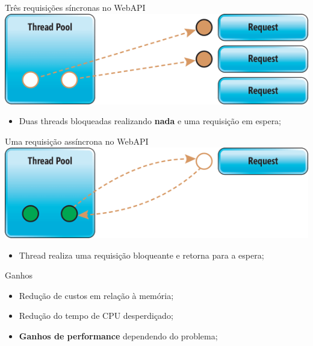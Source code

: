 \documentclass[10pt]{beamer}
\begin{document}
\begin{frame}{Três requisições síncronas no WebAPI}
	\includegraphics[width=\textwidth]{imgs/sync2}
	\vspace{0.5cm}
	
	\begin{itemize}
		\item Duas threads bloqueadas realizando \textbf{nada} e uma requisição em espera;
	\end{itemize}
\end{frame}

\begin{frame}{Uma requisição assíncrona no WebAPI}
	\includegraphics[width=\textwidth]{imgs/async}
	\vspace{0.5cm}
	
	\begin{itemize}
		\item Thread realiza uma requisição bloqueante e retorna para a espera;
	\end{itemize}
\end{frame}

\begin{frame}{Ganhos}
	\begin{itemize}
		\item Redução de custos em relação à memória;
		\vspace{0.2cm}
		\item Redução do tempo de CPU desperdiçado;
		\vspace{0.2cm}
		\item \textbf{Ganhos de performance} dependendo do problema;
	\end{itemize}
\end{frame}
\end{document}
